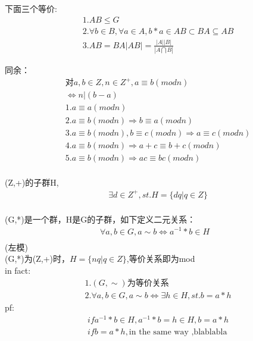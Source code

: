 \documentclass[12pt, a4paper]{article}  %
\begin{document}
下面三个等价:
\begin{align}
    &1.AB\leqslant G\\
    &2.\forall b\in B,\forall a\in A,b*a\in AB\subset BA \subseteq AB\\
    &3.AB=BA   \left\lvert AB\right\rvert =\frac{\left\lvert A\right\rvert  \left\lvert B\right\rvert }{\left\lvert A\bigcap B\right\rvert }
\end{align}

同余：\\
\begin{align}
    &\text{对}a,b\in Z,n\in Z^{+},a\equiv b(mod n)\\
    &\Leftrightarrow n|(b-a)\\
    &1.a\equiv a(mod n)\\
    &2.a\equiv b(mod n)\Rightarrow b\equiv a(mod n)\\
    &3.a\equiv b(mod n),b\equiv c(mod n)\Rightarrow a\equiv c(mod n)\\
    &4.a\equiv b(mod n)\Rightarrow a+c\equiv b+c(mod n)\\
    &5.a\equiv b(mod n)\Rightarrow ac\equiv bc(mod n)\\
\end{align}

(Z,+)的子群H,\\
\begin{align}
    &\exists d\in Z^{+},st. H=\{dq|q\in Z\}\\
\end{align}

(G,*)是一个群，H是G的子群，如下定义二元关系：\\
\begin{align}
    \forall a,b\in G,a\sim b \Leftrightarrow a^{-1}*b\in H\\
\end{align}
(左模)\\

(G,*)为(Z,+)时，\(H=\{nq|q\in Z\}\),等价关系即为mod\\

in fact:
\begin{align}
    &1.(G,\sim) \text{为等价关系}\\
    &2.\forall a,b\in G,a\sim b \Leftrightarrow  \exists h\in H,st. b=a*h
\end{align}
pf:\\
\begin{align}
    & if a^{-1}*b\in H,a^{-1}*b=h\in H,b=a*h\\
    & if b=a*h, \text{in the same way ,blablabla}
\end{align}
\end{document}
